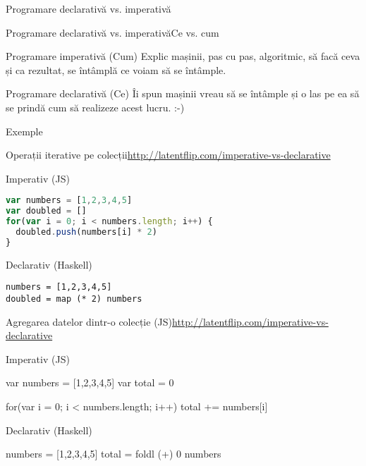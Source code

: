 \documentclass[xcolor=pdftex,romanian,colorlinks]{beamer}
\begin{document}
\begin{section}{Programare declarativă vs. imperativă}
\begin{frame}{Programare declarativă vs. imperativă}{Ce vs. cum}
\begin{block}{Programare imperativă (Cum)}
Explic mașinii, pas cu pas, algoritmic,  să facă ceva și ca rezultat, se întâmplă \alert{ce} voiam să se întâmple.
\end{block}
\vfill\begin{block}{Programare declarativă (Ce)}
Îi spun mașinii  vreau să se întâmple și o las pe ea să se prindă \alert{cum} să realizeze acest lucru. :-)
\end{block}
\end{frame}

\begin{subsection}{Exemple}
\begin{frame}[fragile]{Operații iterative pe colecții}{\url{http://latentflip.com/imperative-vs-declarative}}
\begin{block}{Imperativ (JS)}
{\small
\begin{lstlisting}[language=JavaScript]
var numbers = [1,2,3,4,5]
var doubled = []
for(var i = 0; i < numbers.length; i++) {
  doubled.push(numbers[i] * 2)
}
\end{lstlisting}}
\end{block}

\begin{block}{Declarativ (Haskell)}
{\small
\begin{lstlisting}
numbers = [1,2,3,4,5]
doubled = map (* 2) numbers
\end{lstlisting}}
\end{block}
\end{frame}

\begin{frame}[fragile]{Agregarea datelor dintr-o colecție (JS)}{\url{http://latentflip.com/imperative-vs-declarative}}
\begin{block}{Imperativ (JS)}
{\small
\begin{asciijs}
var numbers = [1,2,3,4,5]
var total = 0

for(var i = 0; i < numbers.length; i++) {
  total += numbers[i]
}
\end{asciijs}}
\end{block}

\begin{block}{Declarativ (Haskell)}
{\small
\begin{asciihs}
numbers = [1,2,3,4,5]
total = foldl (+) 0 numbers
\end{asciihs}}
\end{block}
\end{frame}


\end{subsection}
\end{section}
\end{document}
